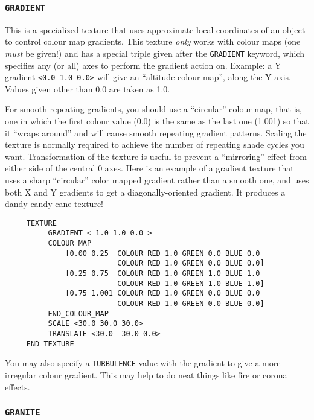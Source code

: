 \subsubsection{{\tt GRADIENT}}

This is a specialized texture that uses approximate local coordinates
of an object to control colour map gradients.  This texture {\em only}
works with colour maps (one {\em must} be given!) and has a special
{\tt <X,Y,Z>} triple given after the {\tt GRADIENT} keyword, which
specifies any (or all) axes to perform the gradient action on.
Example: a Y gradient {\tt <0.0 1.0 0.0>} will give an ``altitude
colour map'', along the Y axis.  Values given other than 0.0 are taken
as 1.0.

For smooth repeating gradients, you should use a ``circular'' colour map, that
is, one in which the first colour value (0.0) is the same as the last one
(1.001) so that it ``wraps around'' and will cause smooth repeating gradient
patterns.  Scaling the texture is normally required to achieve the number of
repeating shade cycles you want.  Transformation of the texture is useful to
prevent a ``mirroring'' effect from either side of the central 0 axes.  Here is
an example of a gradient texture that uses a sharp ``circular'' color mapped
gradient rather than a smooth one, and uses both X and Y gradients to get a
diagonally-oriented gradient.  It produces a dandy candy cane
texture!
\begin{verbatim}
     TEXTURE
          GRADIENT < 1.0 1.0 0.0 >
          COLOUR_MAP
              [0.00 0.25  COLOUR RED 1.0 GREEN 0.0 BLUE 0.0
                          COLOUR RED 1.0 GREEN 0.0 BLUE 0.0]
              [0.25 0.75  COLOUR RED 1.0 GREEN 1.0 BLUE 1.0
                          COLOUR RED 1.0 GREEN 1.0 BLUE 1.0]
              [0.75 1.001 COLOUR RED 1.0 GREEN 0.0 BLUE 0.0
                          COLOUR RED 1.0 GREEN 0.0 BLUE 0.0]
          END_COLOUR_MAP
          SCALE <30.0 30.0 30.0>
          TRANSLATE <30.0 -30.0 0.0>
     END_TEXTURE
\end{verbatim}

You may also specify a {\tt TURBULENCE}
value with the gradient to give a more
irregular colour gradient.  This may help to do neat things like fire or
corona effects.

\subsubsection{{\tt GRANITE}}

